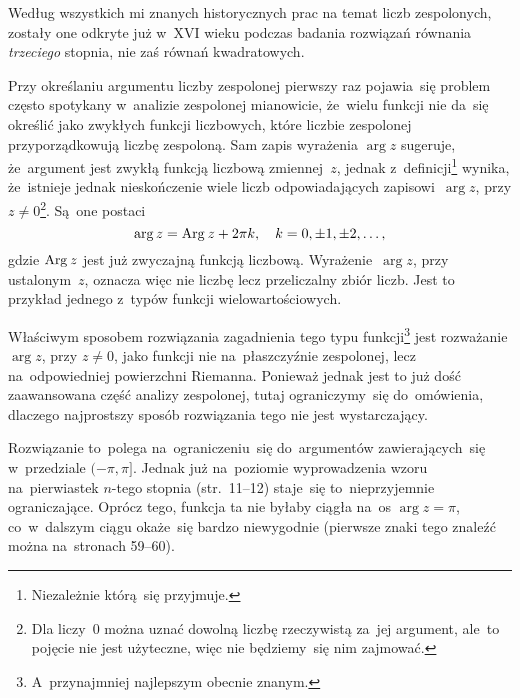 \documentclass[a4paper,11pt]{article}
\begin{document}
\vspace{\spaceFour}


\start {} Według wszystkich mi znanych historycznych prac na
temat liczb zespolonych, zostały one odkryte już w~XVI wieku podczas
badania rozwiązań równania \emph{trzeciego} stopnia, nie zaś równań
kwadratowych. 

\vspace{\spaceFour}


\start {} Przy określaniu argumentu liczby zespolonej pierwszy
raz pojawia~się problem często spotykany w~analizie zespolonej
mianowicie, że~wielu funkcji nie da~się określić jako zwykłych funkcji
liczbowych, które liczbie zespolonej przyporządkowują liczbę
zespoloną. Sam zapis wyrażenia $\arg z$ sugeruje, że~argument jest
zwykłą funkcją liczbową zmiennej~$z$, jednak
z~definicji\footnote{Niezależnie którą~się przyjmuje.} wynika,
że~istnieje jednak nieskończenie wiele liczb odpowiadających
zapisowi~$\arg z$, przy $z \neq 0$\footnote{Dla liczy~$0$ można uznać
  dowolną liczbę rzeczywistą za~jej argument, ale~to pojęcie nie jest
  użyteczne, więc nie będziemy~się nim zajmować.}. Są~one postaci
\begin{equation}
  \label{eq:Leja-07}
  \arg z = \textrm{Arg}\: z + 2\pi k, \quad k = 0, \pm 1, \pm 2,\ldots,
\end{equation}
gdzie $\textrm{Arg}\: z$ jest już zwyczajną funkcją liczbową.
Wyrażenie~$\arg z$, przy ustalonym~$z$, oznacza więc nie liczbę lecz
przeliczalny zbiór liczb. Jest to przykład jednego z~typów funkcji
wielowartościowych.

Właściwym sposobem rozwiązania zagadnienia tego typu
funkcji\footnote{A~przynajmniej najlepszym obecnie znanym.} jest
rozważanie $\arg z$, przy $z \neq 0$, jako funkcji nie na~płaszczyźnie
zespolonej, lecz na~odpowiedniej powierzchni Riemanna. Ponieważ jednak
jest to już dość zaawansowana część analizy zespolonej, tutaj
ograniczymy~się do~omówienia, dlaczego najprostszy sposób rozwiązania
tego nie jest wystarczający.

Rozwiązanie to~polega na~ograniczeniu~się do~argumentów
zawierających~się w~przedziale $( -\pi, \pi ]$. Jednak już na~poziomie
wyprowadzenia wzoru na~pierwiastek $n$-tego stopnia (str.~11--12)
staje~się to~nieprzyjemnie ograniczające. Oprócz tego, funkcja ta nie
byłaby ciągła na~os $\arg z = \pi$, co~w~dalszym ciągu okaże~się
bardzo niewygodnie (pierwsze znaki tego znaleźć można na~stronach
59--60).

\vspace{\spaceFour}
\end{document}
